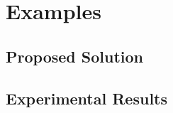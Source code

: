 




\chapter{Examples}\label{ch:examples}
\section{Proposed Solution} %
\label{sec:proposed_solution}



\section{Experimental Results} %
\label{sec:experimental_results}


